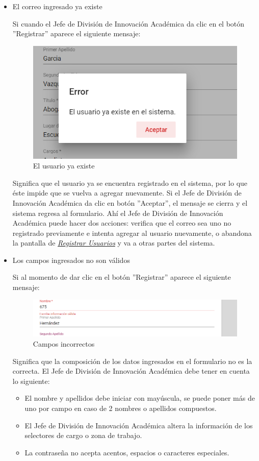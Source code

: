 \begin{itemize}
	\item El correo ingresado ya existe
	
	Si cuando el Jefe de División de Innovación Académica  da clic en el botón ''Registrar'' aparece el siguiente mensaje:
	
	\begin{figure}[H]
		\centering
		\includegraphics[width=0.4\linewidth]{images/SP5/MSG36}
		\caption{El usuario ya existe}
		\label{mensaje36}
		
	\end{figure}
	
	Significa que el usuario ya se encuentra registrado en el sistema, por lo que éste impide que se vuelva a agregar nuevamente. Si el Jefe de División de Innovación Académica  da clic en botón ''Aceptar'', el mensaje se cierra y el sistema regresa al formulario. Ahí el Jefe de División de Innovación Académica   puede hacer dos acciones: verifica que el correo sea uno no registrado previamente e intenta agregar al usuario nuevamente, o abandona la pantalla de \hyperlink{registrarUs}{\textit{Registrar Usuarios}} y va a otras partes del sistema.
	
	\item Los campos ingresados no son válidos
	
	Si al momento de dar clic en el botón ''Registrar'' aparece el siguiente mensaje:
	\begin{figure}[H]
		\centering
		\includegraphics[width=0.4\linewidth]{images/SP5/MSG35}
		\caption{Campos incorrectos}
		\label{mensaje35}
		
	\end{figure}
	
	Significa que la composición de los datos ingresados en el formulario no es la correcta. El Jefe de División de Innovación Académica  debe tener en cuenta lo siguiente:
	
	\begin{itemize}
		\item El nombre y apellidos debe iniciar con mayúscula, se puede poner más de uno por campo en caso de 2 nombres o apellidos compuestos.
		\item El Jefe de División de Innovación Académica  altera la información de los selectores de cargo o zona de trabajo.
		\item La contraseña no acepta acentos, espacios o caracteres especiales.
	\end{itemize}
	
\end{itemize}

